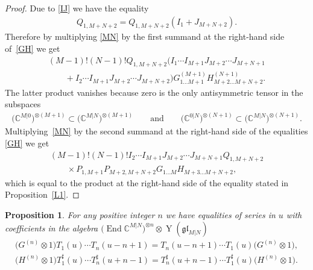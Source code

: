 \documentclass[pdftex]{sigma}
\numberwithin{equation}{section}
\newtheorem{Proposition}[Theorem]{Proposition}
\def\CC{{\mathbb{C}}}
\def\CMN{\CC^{M|N}}
\def\End{\operatorname{End}}
\def\glMN{\mathfrak{gl}_{M|N}}
\def\ot{\otimes}
\def\TS{T^{\sharp}}
\def\YMN{\operatorname{Y}(\glMN)}
\begin{document}
\begin{proof}
Due to \eqref{IJ} we have the equality
\begin{gather*}
Q_{1,M+N+2}=Q_{1,M+N+2} ( I_{1}+J_{M+N+2} ) .
\end{gather*}
Therefore by multiplying \eqref{MN} by the first summand at the
right-hand side of~\eqref{GH} we get
\begin{gather*}
(M-1) ! (N-1) ! Q_{1,M+N+2}
( I_{1} \cdots I_{M+1}
J_{M+2} \cdots J_{M+N+1}
\\
\qquad{} + I_{2} \cdots I_{M+1}
J_{M+2} \cdots J_{M+N+2} )
G^{(M+1)}_{1 \dots M+1} H^{(N+1)}_{M+2 \dots M+N+2} .
\end{gather*}
The latter product vanishes because zero is the only
antisymmetric tensor in the subspaces
\begin{gather*}
\big(\CC^{M| 0}\big)^{\ot (M+1)}\subset\big(\CMN\big)^{\ot (M+1)}
\qquad\text{and}\qquad
\big(\CC^{0 |N}\big)^{\ot (N+1)}\subset\big(\CMN\big)^{\ot (N+1)} .
\end{gather*}
Multiplying~\eqref{MN} by the second summand at the
right-hand side of the equalities \eqref{GH} we get
\begin{gather*}
(M-1) ! (N-1) ! I_{2} \cdots I_{M+1} J_{M+2} \cdots J_{M+N+1} Q_{1,M+N+2}\\
\qquad {} \times P_{1,M+1} P_{M+2,M+N+2}
G_{1 \dots M} H_{M+3 \dots M+N+2},
\end{gather*}
which is equal to the product at the right-hand side of the equality stated in Proposition~\ref{L1}.
\end{proof}

\begin{Proposition}\label{P}
For any positive integer $n$ we have equalities of series in $u$ with coefficients in the algebra
$\big(\End\CMN\big)^{\ot n}\ot\YMN$
\begin{gather*}
\big(G^{(n)}\ot1\big) T_1(u) \cdots T_n(u-n+1) =
T_n(u-n+1) \cdots T_1(u) \big(G^{(n)}\ot1\big) ,\\
\big(H^{(n)}\ot1\big) \TS_1(u) \cdots \TS_n(u+n-1) =
\TS_n(u+n-1) \cdots \TS_1(u) \big(H^{(n)}\ot1\big) .
\end{gather*}
\end{Proposition}
\end{document}
